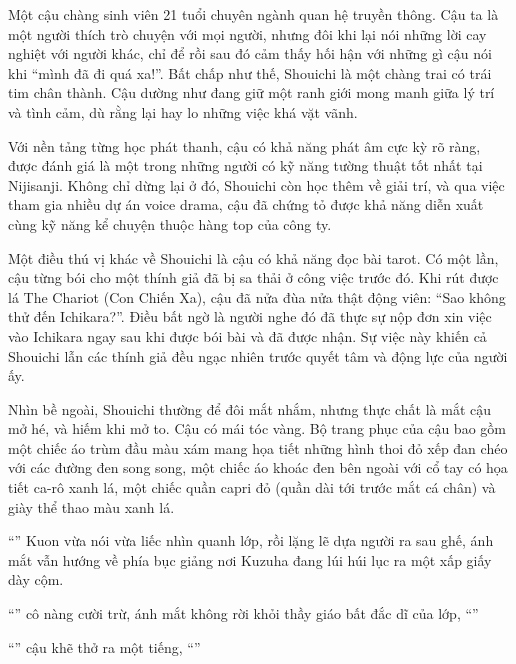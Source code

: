 \documentclass[../main.tex]{subfiles}
\begin{document}
Một cậu chàng sinh viên 21 tuổi chuyên ngành quan hệ truyền thông. Cậu ta là một người thích trò chuyện với mọi người, nhưng đôi khi lại nói những lời cay nghiệt với người khác, chỉ để rồi sau đó cảm thấy hối hận với những gì cậu nói khi ``mình đã đi quá xa!''. Bất chấp như thế, Shouichi là một chàng trai có trái tim chân thành. Cậu dường như đang giữ một ranh giới mong manh giữa lý trí và tình cảm, dù rằng lại hay lo những việc khá vặt vãnh.

Với nền tảng từng học phát thanh, cậu có khả năng phát âm cực kỳ rõ ràng, được đánh giá là một trong những người có kỹ năng tường thuật tốt nhất tại Nijisanji. Không chỉ dừng lại ở đó, Shouichi còn học thêm về giải trí, và qua việc tham gia nhiều dự án voice drama, cậu đã chứng tỏ được khả năng diễn xuất cùng kỹ năng kể chuyện thuộc hàng top của công ty.

Một điều thú vị khác về Shouichi là cậu có khả năng đọc bài tarot. Có một lần, cậu từng bói cho một thính giả đã bị sa thải ở công việc trước đó. Khi rút được lá The Chariot (Con Chiến Xa), cậu đã nửa đùa nửa thật động viên: ``Sao không thử đến Ichikara?''. Điều bất ngờ là người nghe đó đã thực sự nộp đơn xin việc vào Ichikara ngay sau khi được bói bài và đã được nhận. Sự việc này khiến cả Shouichi lẫn các thính giả đều ngạc nhiên trước quyết tâm và động lực của người ấy.

Nhìn bề ngoài, Shouichi thường để đôi mắt nhắm, nhưng thực chất là mắt cậu mở hé, và hiếm khi mở to. Cậu có mái tóc vàng. Bộ trang phục của cậu bao gồm một chiếc áo trùm đầu màu xám mang họa tiết những hình thoi đỏ xếp đan chéo với các đường đen song song, một chiếc áo khoác đen bên ngoài với cổ tay có họa tiết ca-rô xanh lá, một chiếc quần capri đỏ (quần dài tới trước mắt cá chân) và giày thể thao màu xanh lá.

\chrint

``'' Kuon vừa nói vừa liếc nhìn quanh lớp, rồi lặng lẽ dựa người ra sau ghế, ánh mắt vẫn hướng về phía bục giảng nơi Kuzuha đang lúi húi lục ra một xấp giấy dày cộm.

``'' cô nàng cười trừ, ánh mắt không rời khỏi thầy giáo bất đắc dĩ của lớp, ``''

``'' cậu khẽ thở ra một tiếng, ``''
\end{document}
